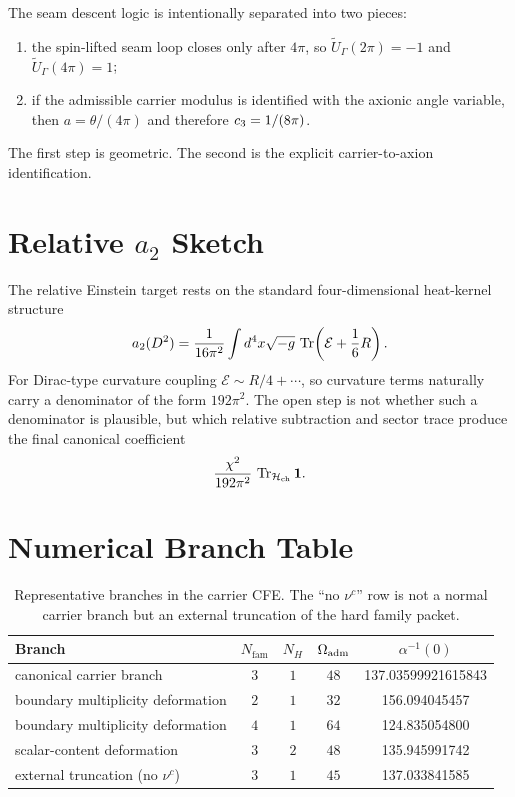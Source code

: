 The seam descent logic is intentionally separated into two pieces:
\begin{enumerate}[leftmargin=1.5em, topsep=3pt, itemsep=2pt]
    \item the spin-lifted seam loop closes only after $4\pi$, so $\widetilde U_\Gamma(2\pi)=-1$ and $\widetilde U_\Gamma(4\pi)=1$;
    \item if the admissible carrier modulus is identified with the axionic angle variable, then $a=\theta/(4\pi)$ and therefore $c_3=1/(8\pi)$.
\end{enumerate}
The first step is geometric. The second is the explicit carrier-to-axion identification.

\section{Relative \texorpdfstring{$a_2$}{a2} Sketch}

The relative Einstein target rests on the standard four-dimensional heat-kernel structure
\[
a_2(D^2)=\frac{1}{16\pi^2}\int d^4x\sqrt{-g}\,
\operatorname{Tr}\!\left(\mathcal E+\frac16 R\right).
\]
For Dirac-type curvature coupling $\mathcal E\sim R/4+\cdots$, so curvature terms naturally carry a denominator of the form $192\pi^2$. The open step is not whether such a denominator is plausible, but which relative subtraction and sector trace produce the final canonical coefficient
\[
\frac{\chi^2}{192\pi^2}\,\operatorname{Tr}_{\mathcal H_{\mathrm{ch}}}\mathbf 1.
\]

\section{Numerical Branch Table}

\begin{table}[H]
\centering
\small
\begin{tabularx}{\linewidth}{@{}>{\raggedright\arraybackslash}Xcccc@{}}
\toprule
Branch & $N_{\mathrm{fam}}$ & $N_H$ & $\Omega_{\mathrm{adm}}$ & $\alpha^{-1}(0)$ \\
\midrule
canonical carrier branch & $3$ & $1$ & $48$ & \num{137.03599921615843} \\
boundary multiplicity deformation & $2$ & $1$ & $32$ & \num{156.094045457} \\
boundary multiplicity deformation & $4$ & $1$ & $64$ & \num{124.835054800} \\
scalar-content deformation & $3$ & $2$ & $48$ & \num{135.945991742} \\
external truncation (no $\nu^c$) & $3$ & $1$ & $45$ & \num{137.033841585} \\
\bottomrule
\end{tabularx}
\caption{Representative branches in the carrier CFE. The ``no $\nu^c$'' row is not a normal carrier branch but an external truncation of the hard family packet.}
\end{table}



